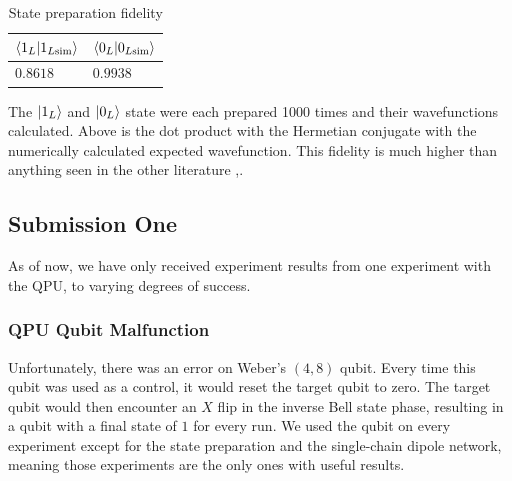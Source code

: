 \documentclass[a4paper,11pt,aps,tightenlines,nofootinbib]{revtex4}
\begin{document}
        \begin{table}[h]
        \begin{centering}
                \begin{tabular}{|l|l|}
                        \hline
                       $\bra{1_{L}}\ket{1_{L\text{sim}}} $ & $\bra{0_L}\ket{0_{L\text{sim}}}$\\ \hline
                       $0.8618$ & $0.9938$\\ \hline
                \end{tabular}
                \caption{State preparation fidelity}
        \end{centering}
        \end{table}
        The $\ket{1_L}$ and $\ket{0_L}$ state were each prepared 1000 times and their wavefunctions calculated. Above is the 
        dot product with the Hermetian conjugate with the numerically calculated expected wavefunction. This 
        fidelity is much higher than anything seen in the other literature \cite{ibm-qsim-qubit-of-space},\cite{qspacetime-on-qsim}.

\subsection{Submission One}        
        As of now, we have only received experiment results from one experiment with the QPU, to varying 
        degrees of success. 

        \subsubsection{QPU Qubit Malfunction}
        Unfortunately, there was an error on Weber's $(4,8)$ qubit. Every time this qubit was used as a control,
        it would reset the target qubit to zero. The target qubit would then encounter an $X$ flip in the inverse Bell 
        state phase, resulting in a 
        qubit with a final state of $1$ for every run. We used the qubit on every experiment except for the state preparation 
        and the single-chain dipole network, meaning those experiments are the only ones with useful results.
\end{document}
